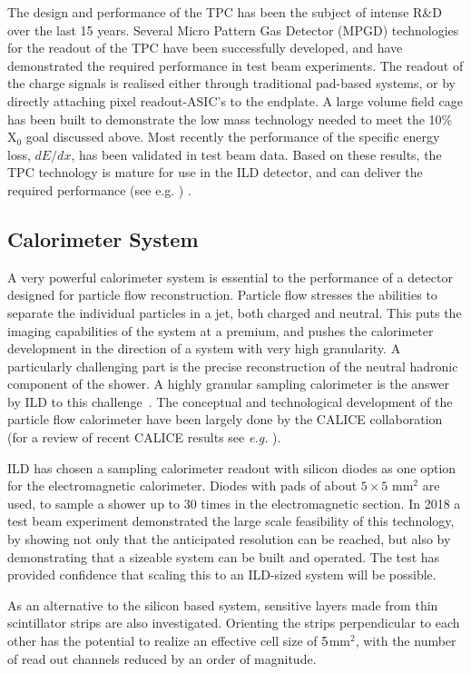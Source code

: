 \documentclass[%
 amsmath,amssymb,
 aps,
 longbibliography,
]{revtex4-1}
\begin{document}
The design and performance of the TPC has been the subject of intense R\&D over the last 15 years. Several Micro Pattern Gas Detector (MPGD) technologies for the readout of the TPC have been successfully developed, and have demonstrated the required performance in test beam experiments. The readout of the charge signals is realised either through traditional pad-based systems, or by directly attaching pixel readout-ASIC's to the endplate. A large volume field cage has been built to demonstrate the low mass technology needed to meet the 10\% X$_0$ goal discussed above. Most recently the performance of the specific energy loss, $dE/dx$, has been validated in test beam data. Based on these results, the TPC technology is mature for use in the ILD detector, and can deliver the required performance (see e.g. \cite{Attie:2016yeu, Bouchez:2007pe}) . 


\subsection{Calorimeter System}
A very powerful calorimeter system is essential to the performance of a detector designed for particle flow reconstruction. Particle flow stresses the abilities to separate the individual particles in a jet, both charged and neutral. This puts the imaging capabilities of the system at a premium, and pushes the calorimeter development in the direction of a system with very high granularity. A particularly challenging part is the precise reconstruction of the neutral hadronic component of the shower. A highly granular sampling calorimeter is the answer by ILD to this challenge~\cite{Sefkow:2015hna}. The conceptual and technological development of the particle flow calorimeter have been largely done by the CALICE collaboration (for a review of recent CALICE results see {\it e.g.} \cite{Grenier:2017ewg}). 

ILD has chosen a sampling calorimeter readout with silicon diodes as one option for the electromagnetic calorimeter. Diodes with pads of about $5 \times 5$ mm$^2$ are used, to sample a shower up to 30 times in the electromagnetic section. In 2018 a test beam experiment demonstrated the large scale feasibility of this technology, by showing not only that the anticipated resolution can be reached, but also by demonstrating that a sizeable system can be built and operated. The test has provided confidence that scaling this to an ILD-sized system will be possible.

As an alternative to the silicon based system, sensitive layers made from thin scintillator strips are also investigated. Orienting the strips perpendicular to each other has the potential to realize an effective cell size of $5\time 5$mm$^2$, with the number of read out channels reduced by an order of magnitude. 
\end{document}
